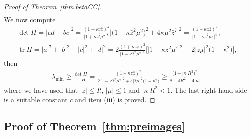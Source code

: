 \documentclass[10pt,a4paper]{amsart}
\numberwithin{equation}{section}
\theoremstyle{definition}
\newcommand{\1}{{\bf 1}}
\newcommand \zbar { \bar{z}}
\begin{document}
\begin{proof}[Proof of Theorem~\ref{thm:betaCC}]
\begin{align*}
	\end{align*}
	We now compute
	\begin{gather*}
		\det H = |ad-bc|^2 = \frac{(1+\kappa z\zbar)^4}{\big|1+\kappa\zbar^2\mu^2\big|^8} \big|\bigl(1-\kappa\zbar^2\mu^2\bigr)^2 + 4\kappa \mu^2 \zbar^2\big|^2 = \frac{(1+\kappa z\zbar)^4}{\big|1+\kappa\zbar^2 \mu^2\big|^4}, \\
		\operatorname{tr} H = |a|^2 + |b|^2 + |c|^2 + |d|^2 = 2 \frac{(1+\kappa z\zbar)^2}{\big|1+\kappa\zbar^2 \mu^2\big|^4} \big[ \big|1-\kappa\zbar^2\mu^2\big|^2 + 2|\zbar\mu|^2 \bigl(1+\kappa^2\bigr) \big],
	\end{gather*}
	then
	\begin{align*}
		\lambda_{\min} \ge \frac{\det H}{\operatorname{tr} H} = \frac{(1+\kappa z\zbar)^2}{2\big|1-\kappa\zbar^2\mu^2\big|^2 + 4 |\zbar\mu|^2 \bigl(1+ \kappa^2\bigr)} \ge \frac{\bigl(1-|\kappa| R^2\bigr)^2}{8+4 R^2+4|\kappa|},
	\end{align*}
	where we have used that $|z|\le R$, $|\mu|\le 1$ and $|\kappa|R^2<1$. The last right-hand side is a suitable constant $c$ and item (iii) is proved.	
\end{proof}


\subsection[Proof of Theorem 4.3]{Proof of Theorem~\ref{thm:preimages}} \label{ssec:proofpreimages}
\end{document}

